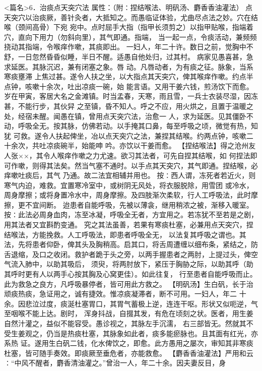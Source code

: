 \documentclass[a4paper,12pt,UTF8,twoside]{ctexbook}
\begin{document}
<篇名>6．治痰点天突穴法
属性：（附∶捏结喉法、明矾汤、麝香香油灌法） 
点天突穴以治痰厥，善针灸者，大抵知之。而愚临证体验，尤曲尽点法之妙。穴在结喉（颈间高骨）下宛 
宛中。点时屈手大指（指甲长须剪之）以指甲贴喉，指端着穴，直向下用力（勿斜向里），其气即通。指端， 
当一起一点，令痰活动，兼频频挠动其指端，令喉痒作嗽，其痰即出。 
一妇人，年二十许。数日之前，觉胸中不舒，一日忽然昏昏似睡，半日不醒。适愚自他处归，过其村。 
病家见愚喜甚，急求延医。其脉沉迟，兼有闭塞之象。唇 动。凡唇动者，为有痰之征。脉象，当系寒痰壅滞 
上焦过甚。遂令人扶之坐，以大指点其天突穴，俾其喉痒作嗽。约点半点钟，咳嗽十余次，吐出凉痰一碗，始 
能言语。又用干姜六钱，煎汤饮下而愈。 
岁在甲寅，客居大名之金滩镇。时当孟春，天寒，雨且雪，一兵士衣装尽湿，因冻甚，不能行步，其伙舁 
之至镇，昏不知人。呼之不应，用火烘之，且置于温暖之处，经宿未醒。闻愚在镇，曾用点天突穴法，治愈一 
人，求为延医。见其僵卧不动，呼吸全无。按其脉，仿佛若动。以手掩其口鼻，每至呼吸之顷，微觉有热，知犹 
可救。遂令人扶起俾坐，冶以点天突穴之法，兼捏其结喉。约两点钟，咳嗽二十余次，共吐凉痰碗半，始能呻 
吟。亦饮以干姜而愈。 
【捏结喉法】得之沧州友人张××，其令人喉痒作嗽之力尤速。欲习其法者，可先自捏其结喉，如 
何捏法即可作嗽，则得其法矣。然当气塞不通时。以手点其天突穴，其气即通。捏结喉，必痒嗽吐痰后，其气 
乃通。故二法宜相辅并用也。 
按∶西人谓，冻死者若近火，则寒气内迫，难救。宜置寒冷室中，或树阴无风处，将衣服脱除，用雪团 
或冷水，周身摩擦；或将身置冷水中，周身摩擦。及四肢渐次柔软，行人工呼吸法，此时摩擦，更不宜间断。 
迨患者自能呼吸，先被以薄衾，继用稍浓之被，渐移入暖室。 
按∶此法必周身血肉，冻至冰凝，呼吸全无者，方宜用之。若冻犹不至若是之剧，用其法者又宜斟酌变通。 
究之其法虽善，若果有寒痰杜塞，必兼用点天突穴，捏结喉法，方能挽救。人工呼吸法，即患者呼吸全无， 
以法复其呼吸之谓也。其法，先将患者仰卧，俾其头及胸稍高。启其口，将舌周遭缠以细布条，紧结之，防 
舌退缩，及口之收闭。救护者跪于头之旁，以两手握患者之两肘，上提过头，俾空气流入肺中，以助其吸后， 
须臾，将两肘放下，紧压于胸胁之际，以助其呼（助其呼时更有人以两手心按其胸及心窝更佳）。如此往复， 
行至患者自能呼吸而止。此为救急之良方，凡呼吸暴停者，皆可用此方救之。 
【明矾汤】生白矾，长于治顽痰热痰，急证用之，诚有捷效。惟凉痰凝滞者，断不可用。一妇人，年二 
十余。因悲泣过度，痰涎杜塞胃口，其胃气蓄极上逆，连连干呕。形状又似呃逆，气至咽喉不能上达。剧时， 
浑身抖战，自掇其发，有危在顷刻之状。医者，用生姜自然汁灌之，益似不能容受。愚诊视之，其脉左手沉濡， 
右三部皆无。然就其不受生姜观之，仍当是热痰杜塞，其脉象如此者，痰多能瘀脉也。且其面有红光，亦系热 
证。遂用生白矾二钱，化水俾饮之，即愈。此方愚用之屡次，审知其非寒痰 
杜塞，皆可随手奏效。即痰厥至垂危者，亦能救愈。 
【麝香香油灌法】严用和云∶“中风不醒者，麝香清油灌之。”曾治一人，年二十余。因夫妻反目，身 
\end{document}

